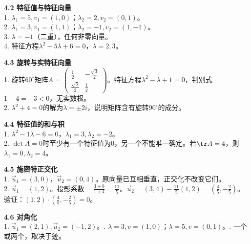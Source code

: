 \noindent\textbf{4.2 特征值与特征向量}\\
1. $\lambda_1=5,v_1=(1,0)$；$\lambda_2=2,v_2=(0,1)$。\\
2. $\lambda_1=3,v_1=(1,1)$；$\lambda_2=-1,v_2=(1,-1)$。\\
3. $\lambda=-1$（二重），任何非零向量。\\
4. 特征方程$\lambda^2-5\lambda+6=0$，$\lambda=2,3$。

\noindent\textbf{4.3 旋转与实特征向量}\\
1. 旋转$60^\circ$矩阵$A=\begin{pmatrix}\frac12&-\frac{\sqrt3}{2}\\\frac{\sqrt3}{2}&\frac12\end{pmatrix}$。特征方程$\lambda^2-\lambda+1=0$，判别式$1-4=-3<0$，无实数根。\\
2. $\lambda^2+4=0$的解为$\lambda=\pm2i$，说明矩阵含有旋转$90^\circ$的成分。

\noindent\textbf{4.4 特征值的和与积}\\
1. $\lambda^2-1\lambda-6=0$，$\lambda_1=3,\lambda_2=-2$。\\
2. $\det A=0$时至少有一个特征值为$0$，另一个不能唯一确定。若$\tr A=4$，则$\lambda_1=0,\lambda_2=4$。

\noindent\textbf{4.5 施密特正交化}\\
1. $\vec u_1=(3,0)$，$\vec u_2=(0,4)$。原向量已互相垂直，正交化不改变它们。\\
2. $\vec u_1=(1,2)$。投影系数$=\frac{3+8}{1+4}=\frac{11}{5}$。$\vec u_2=(3,4)-\frac{11}{5}(1,2)=(\frac{4}{5},-\frac{2}{5})$。验证：$(1,2)\cdot(\frac{4}{5},-\frac{2}{5})=0$。

\noindent\textbf{4.6 对角化}\\
1. $\vec u_1=(2,1),\vec u_2=(-1,2)$。. $\lambda=3,v=(1,0)$；$\lambda=5,v=(0,1)$。. 一个或两个，取决于迹。

